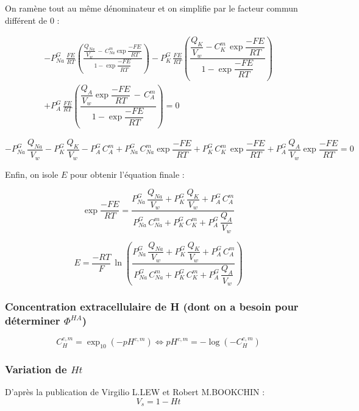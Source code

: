 \documentclass[a4paper,fleqn]{article}
\begin{document}
On ramène tout au même dénominateur et on simplifie par le facteur commun différent de $0$ :

\begin{multline}
-P_{Na}^{G}\,\frac{FE}{RT}\left(\frac{\dfrac{Q_{Na}}{V_w}\,-\,{C_{Na}^{m}\exp{\dfrac{-FE}{RT}}}}{1 - \exp{\dfrac{-FE}{RT}}}\right)-P_{K}^{G}\,\frac{FE}{RT}\left(\dfrac{\dfrac{Q_{K}}{V_w}-{C_{K}^{m}\,\exp{\dfrac{-FE}{RT}}}}{1 - \exp{\dfrac{-FE}{RT}}}\right)\\
+P_{A}^{G}\,\frac{FE}{RT}\left(\dfrac{\dfrac{Q_{A}}{V_w}\exp{\dfrac{-FE}{RT}}\,-\,C_{A}^{m}}{1 - \exp{\dfrac{-FE}{RT}}}\right)=0
\end{multline}


\begin{equation}
-P_{Na}^{G}\,\dfrac{Q_{Na}}{V_w}-P_{K}^{G}\,\dfrac{Q_{K}}{V_w}-P_{A}^{G}\,C_{A}^{m}+P_{Na}^{G}\,C_{Na}^{m}\exp{\dfrac{-FE}{RT}}+P_{K}^{G}\,C_{K}^{m}\,\exp{\dfrac{-FE}{RT}}+P_{A}^{G}\,\dfrac{Q_{A}}{V_w}\exp{\dfrac{-FE}{RT}}=0
\end{equation}

Enfin, on isole $E$ pour obtenir l'équation finale :

\begin{equation}
\exp{\dfrac{-FE}{RT}}=\dfrac{P_{Na}^{G}\,\dfrac{Q_{Na}}{V_w}+P_{K}^{G}\,\dfrac{Q_{K}}{V_w}+P_{A}^{G}\,C_{A}^{m}}{P_{Na}^{G}\,C_{Na}^{m}+P_{K}^{G}\,C_{K}^{m}+P_{A}^{G}\,\dfrac{Q_{A}}{V_w}}
\end{equation}

\begin{equation*}
E=\dfrac{-RT}{F}\,\ln\left(\dfrac{P_{Na}^{G}\,\dfrac{Q_{Na}}{V_w}+P_{K}^{G}\,\dfrac{Q_{K}}{V_w}+P_{A}^{G}\,C_{A}^{m}}{P_{Na}^{G}\,C_{Na}^{m}+P_{K}^{G}\,C_{K}^{m}+P_{A}^{G}\,\dfrac{Q_{A}}{V_w}}\right)
\end{equation*}

\subsubsection*{Concentration extracellulaire de H (dont on a besoin pour déterminer $\Phi^{HA}$)}
\begin{equation}
{C_{H}^{c,m}=\exp_{10}{\left(-pH^{c,m}\right)}}\Longleftrightarrow{pH^{c,m}=-\log{\left(-C_{H}^{c,m}\right)}}\label{eq:pH}
\end{equation}

\subsubsection*{Variation de $Ht$}
D'après la publication de Virgilio L.LEW et Robert M.BOOKCHIN : 
\begin{equation}
V_s = 1-Ht \label{eq:Vs}
\end{equation}
\end{document}
